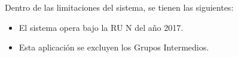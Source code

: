 Dentro de las limitaciones del sistema, se tienen las siguientes:

\begin{itemize}
    \item El sistema opera bajo la RU N del año 2017.
    
    \item Esta aplicación se excluyen los Grupos Intermedios.
\end{itemize}